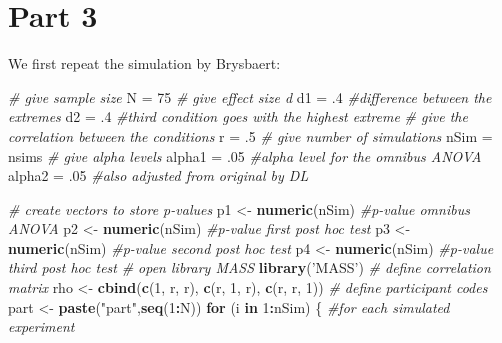 \documentclass[]{book}
\newenvironment{Shaded}{\begin{snugshade}}{\end{snugshade}}
\newcommand{\CommentTok}[1]{\textcolor[rgb]{0.56,0.35,0.01}{\textit{#1}}}
\newcommand{\ControlFlowTok}[1]{\textcolor[rgb]{0.13,0.29,0.53}{\textbf{#1}}}
\newcommand{\DecValTok}[1]{\textcolor[rgb]{0.00,0.00,0.81}{#1}}
\newcommand{\FloatTok}[1]{\textcolor[rgb]{0.00,0.00,0.81}{#1}}
\newcommand{\KeywordTok}[1]{\textcolor[rgb]{0.13,0.29,0.53}{\textbf{#1}}}
\newcommand{\NormalTok}[1]{#1}
\newcommand{\OperatorTok}[1]{\textcolor[rgb]{0.81,0.36,0.00}{\textbf{#1}}}
\newcommand{\StringTok}[1]{\textcolor[rgb]{0.31,0.60,0.02}{#1}}
\begin{document}
\hypertarget{part-3-1}{%
\section{Part 3}\label{part-3-1}}

We first repeat the simulation by Brysbaert:

\begin{Shaded}
\begin{Highlighting}[]
\CommentTok{# give sample size}
\NormalTok{N =}\StringTok{ }\DecValTok{75}
\CommentTok{# give effect size d}
\NormalTok{d1 =}\StringTok{ }\FloatTok{.4} \CommentTok{#difference between the extremes}
\NormalTok{d2 =}\StringTok{ }\FloatTok{.4} \CommentTok{#third condition goes with the highest extreme}
\CommentTok{# give the correlation between the conditions}
\NormalTok{r =}\StringTok{ }\FloatTok{.5}
\CommentTok{# give number of simulations}
\NormalTok{nSim =}\StringTok{ }\NormalTok{nsims}
\CommentTok{# give alpha levels}
\NormalTok{alpha1 =}\StringTok{ }\FloatTok{.05} \CommentTok{#alpha level for the omnibus ANOVA}
\NormalTok{alpha2 =}\StringTok{ }\FloatTok{.05} \CommentTok{#also adjusted from original by DL}


\CommentTok{# create vectors to store p-values}
\NormalTok{p1 <-}\StringTok{ }\KeywordTok{numeric}\NormalTok{(nSim) }\CommentTok{#p-value omnibus ANOVA}
\NormalTok{p2 <-}\StringTok{ }\KeywordTok{numeric}\NormalTok{(nSim) }\CommentTok{#p-value first post hoc test}
\NormalTok{p3 <-}\StringTok{ }\KeywordTok{numeric}\NormalTok{(nSim) }\CommentTok{#p-value second post hoc test}
\NormalTok{p4 <-}\StringTok{ }\KeywordTok{numeric}\NormalTok{(nSim) }\CommentTok{#p-value third post hoc test}
\CommentTok{# open library MASS}
\KeywordTok{library}\NormalTok{(}\StringTok{'MASS'}\NormalTok{)}
\CommentTok{# define correlation matrix}
\NormalTok{rho <-}\StringTok{ }\KeywordTok{cbind}\NormalTok{(}\KeywordTok{c}\NormalTok{(}\DecValTok{1}\NormalTok{, r, r), }\KeywordTok{c}\NormalTok{(r, }\DecValTok{1}\NormalTok{, r), }\KeywordTok{c}\NormalTok{(r, r, }\DecValTok{1}\NormalTok{))}
\CommentTok{# define participant codes}
\NormalTok{part <-}\StringTok{ }\KeywordTok{paste}\NormalTok{(}\StringTok{"part"}\NormalTok{,}\KeywordTok{seq}\NormalTok{(}\DecValTok{1}\OperatorTok{:}\NormalTok{N))}
\ControlFlowTok{for}\NormalTok{ (i }\ControlFlowTok{in} \DecValTok{1}\OperatorTok{:}\NormalTok{nSim) \{}
  \CommentTok{#for each simulated experiment}


\end{Highlighting}
\end{Shaded}
\end{document}
